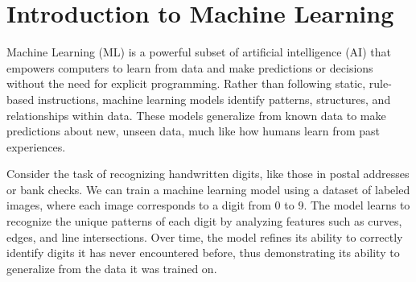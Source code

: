 \section{Introduction to Machine Learning}
\begin{flushleft}
    \large Machine Learning (ML) is a powerful subset of artificial intelligence (AI) that empowers computers to learn from data and make predictions or decisions without the need for explicit programming. Rather than following static, rule-based instructions, machine learning models identify patterns, structures, and relationships within data. These models generalize from known data to make predictions about new, unseen data, much like how humans learn from past experiences. \break
    
    Consider the task of recognizing handwritten digits, like those in postal addresses or bank checks. We can train a machine learning model using a dataset of labeled images, where each image corresponds to a digit from 0 to 9. The model learns to recognize the unique patterns of each digit by analyzing features such as curves, edges, and line intersections. Over time, the model refines its ability to correctly identify digits it has never encountered before, thus demonstrating its ability to generalize from the data it was trained on.
\end{flushleft}
